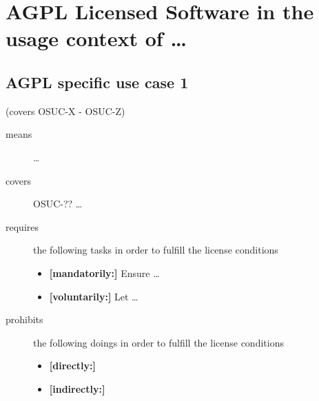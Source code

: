 %
%
%
%
%



\section{AGPL Licensed Software in the usage context of \ldots}
\label{OSUC-01-AGPL} \label{OSUC-03-AGPL} 
\label{OSUC-06-AGPL} \label{OSUC-09-AGPL}

\label{OSUC-02-AGPL} \label{OSUC-04-AGPL} \label{OSUC-05-AGPL}
\label{OSUC-07-AGPL} \label{OSUC-08-AGPL} \label{OSUC-10-AGPL}


\subsection{AGPL specific use case 1}
(covers OSUC-X - OSUC-Z)
\begin{description}
\item[means] \ldots

\item[covers] OSUC-?? \ldots

\item[requires] the following tasks in order to fulfill the license conditions
\begin{itemize}
  \item \textbf{[mandatorily:]} Ensure \ldots
  \item \textbf{[voluntarily:]} Let \ldots
\end{itemize}

\item[prohibits] the following doings in order to fulfill the license conditions
\begin{itemize}
  \item \textbf{[directly:]} 
  \item \textbf{[indirectly:]}
\end{itemize}
\end{description}

